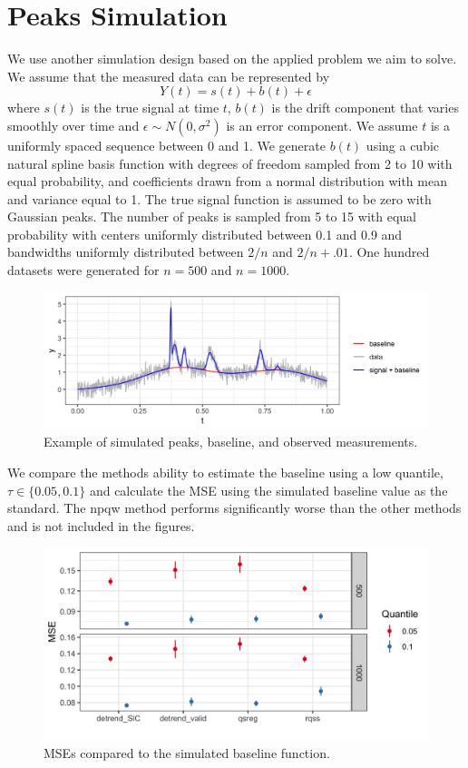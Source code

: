 \documentclass[]{article}
\begin{document}
\section{Peaks Simulation}
We use another simulation design based on the applied problem we aim to solve. We assume that the measured data can be represented by 
\begin{equation}
Y(t) = s(t) + b(t) + \epsilon
\end{equation} 
where $s(t)$ is the true signal at time $t$, $b(t)$ is the drift component that varies smoothly over time and $\epsilon \sim N(0, \sigma^2)$ is an error component. We assume $t$ is a uniformly spaced sequence between 0 and 1. We generate $b(t)$ using a cubic natural spline basis function with degrees of freedom sampled from 2 to 10 with equal probability, and coefficients drawn from a normal distribution with mean and variance equal to 1. The true signal function is assumed to be zero with Gaussian peaks. The number of peaks is sampled from 5 to 15 with equal probability with centers uniformly distributed between 0.1 and 0.9 and bandwidths uniformly distributed between $2/n$ and $2/n + .01$. One hundred datasets were generated for $n=500$ and $n=1000$. 

\begin{figure}
	\caption{Example of simulated peaks, baseline, and observed measurements.}
	\includegraphics[width = \linewidth]{Figures/ex_peaks.png}
\end{figure}

We compare the methods ability to estimate the baseline using a low quantile, $\tau \in \{0.05, 0.1\}$ and calculate the MSE using the simulated baseline value as the standard. The npqw method performs significantly worse than the other methods and is not included in the figures. 

\begin{figure}[h!]
	\caption{MSEs compared to the simulated baseline function.}
	\includegraphics[width = \linewidth]{Figures/peaks_mse.png}
\end{figure}
\end{document}
